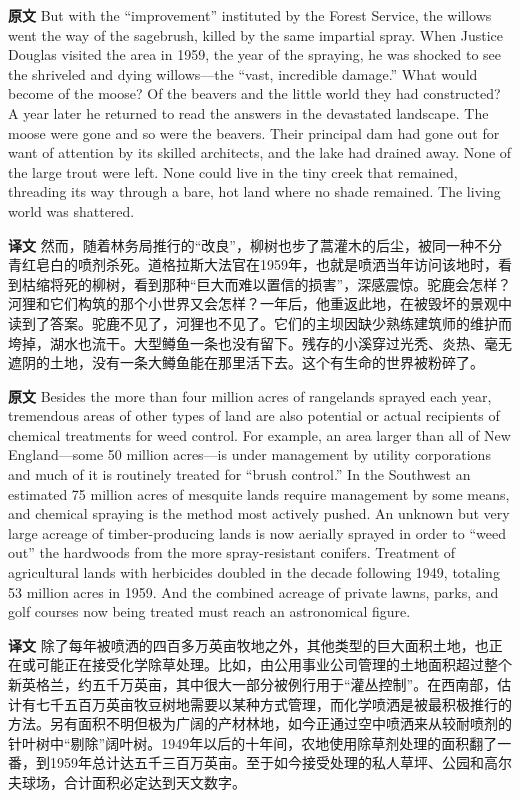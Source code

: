\documentclass[UTF8,zihao=-4]{ctexart}
\begin{document}
\noindent\textbf{原文} But with the ``improvement'' instituted by the Forest Service, the willows went the way of the sagebrush, killed by the same impartial spray. When Justice Douglas visited the area in 1959, the year of the spraying, he was shocked to see the shriveled and dying willows---the ``vast, incredible damage.'' What would become of the moose? Of the beavers and the little world they had constructed? A year later he returned to read the answers in the devastated landscape. The moose were gone and so were the beavers. Their principal dam had gone out for want of attention by its skilled architects, and the lake had drained away. None of the large trout were left. None could live in the tiny creek that remained, threading its way through a bare, hot land where no shade remained. The living world was shattered.
\par
\noindent\textbf{译文} 然而，随着林务局推行的“改良”，柳树也步了蒿灌木的后尘，被同一种不分青红皂白的喷剂杀死。道格拉斯大法官在1959年，也就是喷洒当年访问该地时，看到枯缩将死的柳树，看到那种“巨大而难以置信的损害”，深感震惊。驼鹿会怎样？河狸和它们构筑的那个小世界又会怎样？一年后，他重返此地，在被毁坏的景观中读到了答案。驼鹿不见了，河狸也不见了。它们的主坝因缺少熟练建筑师的维护而垮掉，湖水也流干。大型鳟鱼一条也没有留下。残存的小溪穿过光秃、炎热、毫无遮阴的土地，没有一条大鳟鱼能在那里活下去。这个有生命的世界被粉碎了。
\par\medskip

\noindent\textbf{原文} Besides the more than four million acres of rangelands sprayed each year, tremendous areas of other types of land are also potential or actual recipients of chemical treatments for weed control. For example, an area larger than all of New England---some 50 million acres---is under management by utility corporations and much of it is routinely treated for ``brush control.'' In the Southwest an estimated 75 million acres of mesquite lands require management by some means, and chemical spraying is the method most actively pushed. An unknown but very large acreage of timber-producing lands is now aerially sprayed in order to ``weed out'' the hardwoods from the more spray-resistant conifers. Treatment of agricultural lands with herbicides doubled in the decade following 1949, totaling 53 million acres in 1959. And the combined acreage of private lawns, parks, and golf courses now being treated must reach an astronomical figure.
\par
\noindent\textbf{译文} 除了每年被喷洒的四百多万英亩牧地之外，其他类型的巨大面积土地，也正在或可能正在接受化学除草处理。比如，由公用事业公司管理的土地面积超过整个新英格兰，约五千万英亩，其中很大一部分被例行用于“灌丛控制”。在西南部，估计有七千五百万英亩牧豆树地需要以某种方式管理，而化学喷洒是被最积极推行的方法。另有面积不明但极为广阔的产材林地，如今正通过空中喷洒来从较耐喷剂的针叶树中“剔除”阔叶树。1949年以后的十年间，农地使用除草剂处理的面积翻了一番，到1959年总计达五千三百万英亩。至于如今接受处理的私人草坪、公园和高尔夫球场，合计面积必定达到天文数字。
\par\medskip
\end{document}
